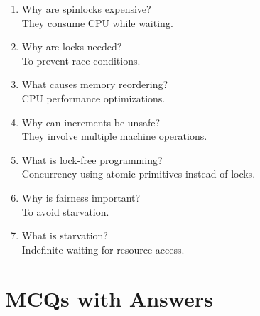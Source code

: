 \begin{enumerate}
\item Why are spinlocks expensive?\\
They consume CPU while waiting.

\item Why are locks needed?\\
To prevent race conditions.

\item What causes memory reordering?\\
CPU performance optimizations.

\item Why can increments be unsafe?\\
They involve multiple machine operations.

\item What is lock-free programming?\\
Concurrency using atomic primitives instead of locks.

\item Why is fairness important?\\
To avoid starvation.

\item What is starvation?\\
Indefinite waiting for resource access.
\end{enumerate}

\section{MCQs with Answers}

